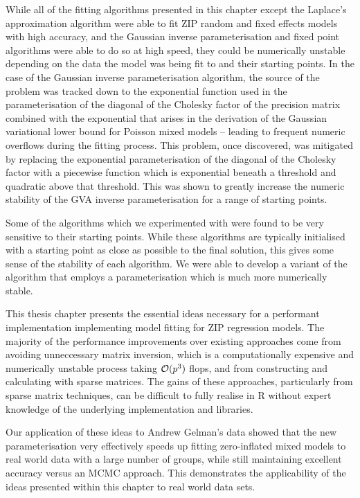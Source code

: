 While all of the fitting algorithms presented in this chapter except the
Laplace's approximation algorithm were able to fit ZIP random and fixed effects
models with high accuracy, and the  Gaussian inverse parameterisation and fixed
point algorithms were able to do so at high speed, they  could be numerically
unstable depending on the data the model was being fit to and their starting
points. In the case of the Gaussian inverse parameterisation algorithm, the
source of the problem was tracked down to the exponential function used in the
parameterisation of the diagonal of the Cholesky factor of the precision matrix
combined with the exponential that arises in the derivation of the Gaussian
variational lower bound for Poisson mixed models -- leading to frequent numeric
overflows during the fitting process. This problem, once discovered, was
mitigated by replacing the exponential parameterisation of the diagonal of the
Cholesky factor with a piecewise function which is exponential beneath a
threshold and quadratic above that threshold. This was shown to greatly
increase the numeric stability of the GVA inverse parameterisation for a range
of starting points.

Some of the algorithms which we experimented with were found to be very
sensitive to their starting points.  While these algorithms are typically
initialised with a starting point as close as possible to the final solution,
this gives some sense of the stability of each algorithm. We were able to
develop a variant of the algorithm that employs a parameterisation which is
much more numerically stable.

This thesis chapter presents the essential ideas necessary for a performant
implementation implementing model fitting for ZIP regression models.
The majority of the performance improvements over existing approaches come from
avoiding unneccessary matrix inversion, which is a computationally expensive
and numerically unstable process taking $\mathcal{O}(p^3)$ flops, and  from
constructing and calculating with sparse matrices. The gains of these
approaches, particularly from sparse  matrix techniques, can be difficult to
fully realise in R without expert knowledge of the underlying implementation
and libraries.
		
Our application of these ideas to Andrew Gelman's data showed that the new
parameterisation very effectively speeds up fitting zero-inflated mixed models
to real world data with a large number of groups, while still maintaining
excellent accuracy versus an MCMC approach. This demonstrates the applicability
of the ideas presented within this chapter to real world data sets.
